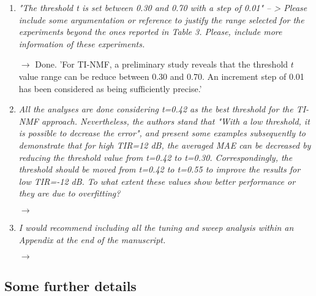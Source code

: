 \documentclass[10pt]{article}
\begin{document}
\begin{enumerate}
\item \emph{"The threshold t is set between 0.30 and 0.70 with a step of 0.01" -- > Please include some argumentation or reference to justify the range selected for the experiments beyond the ones reported in Table 3. Please, include more information of these experiments.}

$\rightarrow$ Done. 'For TI-NMF, a preliminary study reveals that the threshold $t$ value range can be reduce between  0.30 and 0.70. An increment step of 0.01 has been considered as being sufficiently precise.'

\item \emph{All the analyses are done considering t=0.42 as the best threshold for the TI-NMF approach. Nevertheless, the authors stand that "With a low threshold, it is possible to decrease the error", and present some examples subsequently to demonstrate that for high TIR=12 dB, the averaged MAE can be decreased by reducing the threshold value from t=0.42 to t=0.30. Correspondingly, the threshold should be moved from t=0.42 to t=0.55 to improve the results for low TIR=-12 dB. To what extent these values show better performance or they are due to overfitting?}

$\rightarrow$ 

\item \emph{I would recommend including all the tuning and sweep analysis within an Appendix at the end of the manuscript.}

$\rightarrow$ 

\end{enumerate}

\subsection{Some further details}
\end{document}
